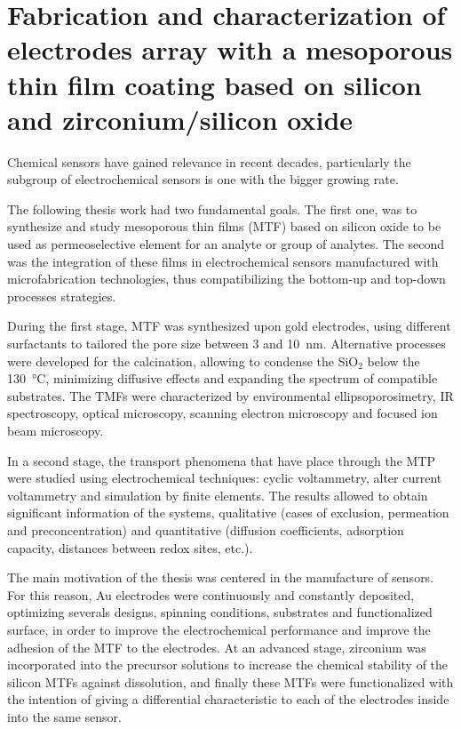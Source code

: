 \mtcaddchapter[Abstract]

\section*{\centering\large{\bfseries{Fabrication and characterization of electrodes array with a mesoporous thin film coating based on silicon and zirconium/silicon oxide}}}

\vspace*{\fill}

Chemical sensors have gained relevance in recent decades, particularly the subgroup of electrochemical sensors is one with the bigger growing rate.

The following thesis work had two fundamental goals. The first one, was to synthesize and study mesoporous thin films (MTF) based on silicon oxide to be used as permeoselective element for an analyte or group of analytes. The second was the integration of these films in electrochemical sensors manufactured with microfabrication technologies, thus compatibilizing the bottom-up and top-down processes strategies.

During the first stage, MTF was synthesized upon gold electrodes, using different surfactants to tailored the pore size between 3 and \SI{10}{\nm}. Alternative processes were developed for the calcination, allowing to condense the SiO$_2$ below the \SI{130}{\celsius}, minimizing diffusive effects and expanding the spectrum of compatible substrates. The TMFs were characterized by environmental ellipsoporosimetry, IR spectroscopy, optical microscopy, scanning electron microscopy and focused ion beam microscopy.

In a second stage, the transport phenomena that have place through the MTP were studied using electrochemical techniques: cyclic voltammetry, alter current voltammetry and simulation by finite elements. The results allowed to obtain significant information of the systems, qualitative (cases of exclusion, permeation and preconcentration) and quantitative (diffusion coefficients, adsorption capacity, distances between redox sites, etc.).

The main motivation of the thesis was centered in the manufacture of sensors. For this reason, Au electrodes were continuously and constantly deposited, optimizing severals designs, spinning conditions, substrates and functionalized surface, in order to improve the electrochemical performance and improve the adhesion of the MTF to the electrodes. At an advanced stage, zirconium was incorporated into the precursor solutions to increase the chemical stability of the silicon MTFs against dissolution, and finally these MTFs were functionalized with the intention of giving a differential  characteristic to each of the electrodes inside into the same sensor.

